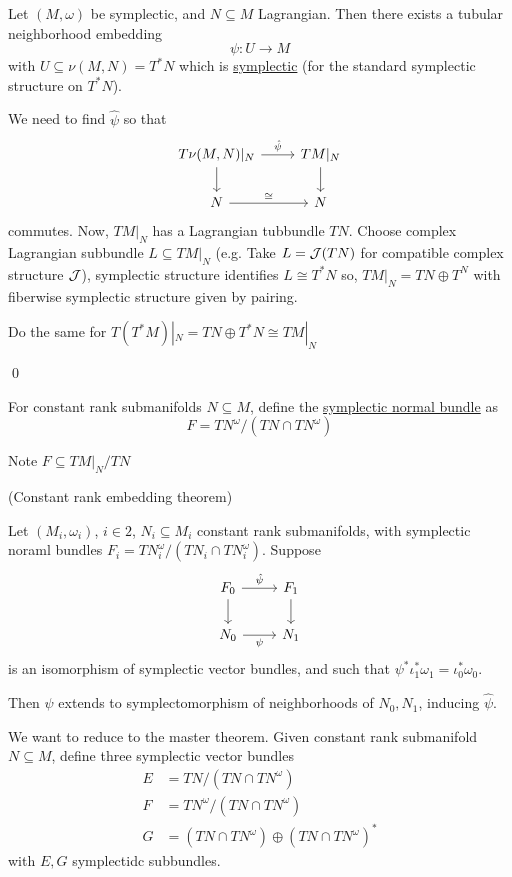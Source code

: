 \documentclass[x11names,reqno,14pt]{extarticle}
\newcommand{\J}{\mc{J}}
\begin{document}
Let $(M,\omega)$ be symplectic, and $N\subseteq M$ Lagrangian. Then there exists a tubular neighborhood embedding
\[
\psi:U\to M
\]
with $U \subseteq\nu(M,N) = T^*N$ which is \underline{symplectic} (for the standard symplectic structure on $T^*N$).

\proof

We need to find $\hat{\psi}$ so that 
\[
\begin{tikzcd}
T\nu(M,N)|_N \ar[r,"\hat{\psi}"] \ar[d] & TM|_N \ar[d] \\
N \ar[r, "\cong"] & N
\end{tikzcd}
\]
commutes. Now, $TM|_N$ has a Lagrangian tubbundle $TN$. Choose complex Lagrangian subbundle $L \subseteq TM|_N$ (e.g. Take $L = \J(TN)$ for compatible complex structure $\J$), symplectic structure identifies $L \cong T^*N$ so, $TM|_N = TN \oplus T^N$ with fiberwise symplectic structure given by pairing. 

Do the same for $T(T^*M)|_N = TN \oplus T^*N\cong TM|_N$

\qed

For constant rank submanifolds $N \subseteq M$, define the \underline{symplectic normal bundle} as 
\[
F = TN^\omega / (TN \cap TN^\omega)
\]

Note $F \subseteq TM|_N/TN$

\thm(Constant rank embedding theorem)

Let $(M_i,\omega_i)$, $i \in 2$, $N_i \subseteq M_i$ constant rank submanifolds, with symplectic noraml bundles $F_i = TN_i^\omega /(TN_i \cap TN_i^\omega)$. Suppose
\[
\begin{tikzcd}
F_0 \ar[r, "\hat{\psi}"] \ar[d] & F_1 \ar[d] \\
N_0  \ar[r,"\psi"'] & N_1
\end{tikzcd}
\]
is an isomorphism of symplectic vector bundles, and such that $\psi^*\iota_1^*\omega_1 = \iota_0^*\omega_0$. 

Then $\psi$ extends to symplectomorphism of neighborhoods of $N_0, N_1$, inducing $\hat{\psi}$. 

\proof

We want to reduce to the master theorem. Given constant rank submanifold $N \subseteq M$, define three symplectic vector bundles 
\begin{align*}
E & = TN/(TN\cap TN^\omega) \\
F & = TN^\omega/(TN\cap TN^\omega) \\
G & = (TN \cap TN^\omega)\oplus(TN\cap TN^\omega)^*
\end{align*}
with $E, G$ symplectidc subbundles. 
\end{document}
